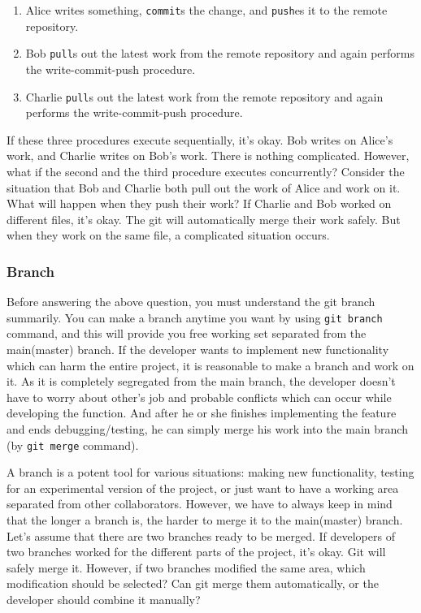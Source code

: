 \documentclass{oblivoir}
\begin{document}
\begin{enumerate}
    \item Alice writes something, \texttt{commit}s the change, and \texttt{push}es it to the remote repository.
    \item Bob \texttt{pull}s out the latest work from the remote repository and again performs the write-commit-push procedure.
    \item Charlie \texttt{pull}s out the latest work from the remote repository and again performs the write-commit-push procedure.
\end{enumerate}

If these three procedures execute sequentially, it's okay. Bob writes on Alice's work, and Charlie writes on Bob's work. There is nothing complicated. However, what if the second and the third procedure executes concurrently? Consider the situation that Bob and Charlie both pull out the work of Alice and work on it. What will happen when they push their work?  If Charlie and Bob worked on different files, it's okay. The git will automatically merge their work safely. But when they work on the same file, a complicated situation occurs. 

\subsubsection{Branch}


Before answering the above question, you must understand the git branch summarily. You can make a branch anytime you want by using \texttt{git branch} command, and this will provide you free working set separated from the main(master) branch. If the developer wants to implement new functionality which can harm the entire project, it is reasonable to make a branch and work on it. As it is completely segregated from the main branch, the developer doesn't have to worry about other's job and probable conflicts which can occur while developing the function. And after he or she finishes implementing the feature and ends debugging/testing, he can simply merge his work into the main branch (by \texttt{git merge} command). 

A branch is a potent tool for various situations: making new functionality, testing for an experimental version of the project, or just want to have a working area separated from other collaborators. However, we have to always keep in mind that the longer a branch is, the harder to merge it to the main(master) branch. Let's assume that there are two branches ready to be merged. If developers of two branches worked for the different parts of the project, it's okay. Git will safely merge it. However, if two branches modified the same area, which modification should be selected? Can git merge them automatically, or the developer should combine it manually? 
\end{document}

